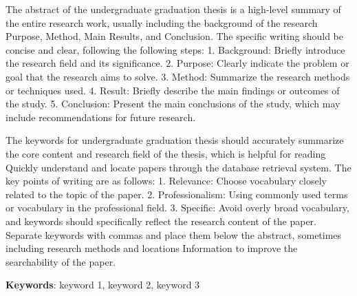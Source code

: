 \newpage
\begin{center}
    \fontsize{18}{1}
\end{center}
\begin{tcolorbox}
\begin{center}
    \fontsize{14}{0}   %
\end{center}
\vspace{8mm}
\noindent
{\fontsize{16}{0}}
\vspace{2mm}
\setlength{\parindent}{24pt}

  The abstract of the undergraduate graduation thesis is a high-level summary of the entire research work, usually including the background of the research
  Purpose, Method, Main Results, and Conclusion. The specific writing should be concise and clear, following the following steps:
  1. Background: Briefly introduce the research field and its significance.
  2. Purpose: Clearly indicate the problem or goal that the research aims to solve.
  3. Method: Summarize the research methods or techniques used.
  4. Result: Briefly describe the main findings or outcomes of the study.
  5. Conclusion: Present the main conclusions of the study, which may include recommendations for future research.

  The keywords for undergraduate graduation thesis should accurately summarize the core content and research field of the thesis, which is helpful for reading
  Quickly understand and locate papers through the database retrieval system. The key points of writing are as follows:
  1. Relevance: Choose vocabulary closely related to the topic of the paper.
  2. Professionalism: Using commonly used terms or vocabulary in the professional field.
  3. Specific: Avoid overly broad vocabulary, and keywords should specifically reflect the research content of the paper.
  Separate keywords with commas and place them below the abstract, sometimes including research methods and locations
  Information to improve the searchability of the paper.

\vspace{8mm}

\noindent
{\fontsize{12}{0}\heiti\textbf{Keywords}}: keyword 1, keyword 2, keyword 3    %
\end{tcolorbox}

\setlength{\parindent}{24pt}


